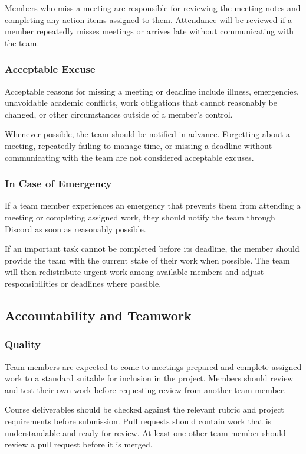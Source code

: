 \documentclass{article}
\begin{document}
Members who miss a meeting are responsible for reviewing the meeting notes and completing any action items assigned to them. Attendance will be reviewed if a member repeatedly misses meetings or arrives late without communicating with the team.

\subsubsection*{Acceptable Excuse}

Acceptable reasons for missing a meeting or deadline include illness, emergencies, unavoidable academic conflicts, work obligations that cannot reasonably be changed, or other circumstances outside of a member's control.

Whenever possible, the team should be notified in advance. Forgetting about a meeting, repeatedly failing to manage time, or missing a deadline without communicating with the team are not considered acceptable excuses.

\subsubsection*{In Case of Emergency}

If a team member experiences an emergency that prevents them from attending a meeting or completing assigned work, they should notify the team through Discord as soon as reasonably possible.

If an important task cannot be completed before its deadline, the member should provide the team with the current state of their work when possible. The team will then redistribute urgent work among available members and adjust responsibilities or deadlines where possible.

\subsection*{Accountability and Teamwork}

\subsubsection*{Quality} 

Team members are expected to come to meetings prepared and complete assigned work to a standard suitable for inclusion in the project. Members should review and test their own work before requesting review from another team member.

Course deliverables should be checked against the relevant rubric and project requirements before submission. Pull requests should contain work that is understandable and ready for review. At least one other team member should review a pull request before it is merged.
\end{document}
